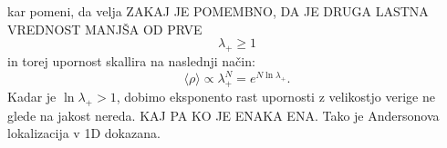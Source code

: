 \begin{appendices}
\begin{equation}
\end{equation} 
kar pomeni, da velja ZAKAJ JE POMEMBNO, DA JE DRUGA LASTNA VREDNOST MANJŠA OD PRVE
\begin{equation}
\lambda_+ \geq 1
\end{equation}
in torej upornost skallira na naslednji način: 
\begin{equation}
\langle \rho \rangle \propto \lambda_+^N = e^{N \ln \lambda_+}.
\end{equation}
Kadar je $\ln \lambda_+ > 1$, dobimo eksponento rast upornosti z velikostjo verige ne glede na jakost nereda. KAJ PA KO JE ENAKA ENA. Tako je Andersonova lokalizacija v 1D dokazana.
\end{appendices}
